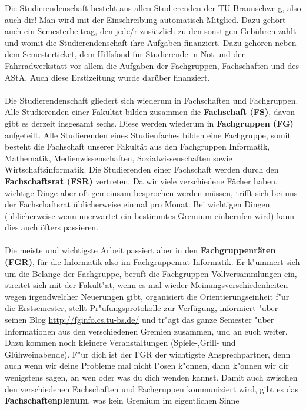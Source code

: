 Die Studierendenschaft besteht aus allen Studierenden der TU Braunschweig, also auch dir!
Man wird mit der Einschreibung automatisch Mitglied. Dazu gehört auch ein Semesterbeitrag, den jede/r 
zusätzlich zu den sonstigen Gebühren zahlt und womit die Studierendenschaft ihre Aufgaben finanziert. 
Dazu gehören neben dem Semesterticket, dem Hilfsfond für Studierende in Not und der 
Fahrradwerkstatt vor allem die Aufgaben der Fachgruppen, Fachschaften und des AStA. Auch diese
Erstizeitung wurde darüber finanziert.
\\
\\
Die Studierendenschaft gliedert sich wiederum in Fachschaften und Fachgruppen.
Alle Studierenden einer Fakultät bilden zusammen die \textbf{Fachschaft (FS)}, davon gibt es derzeit insgesamt sechs.
Diese werden wiederum in  \textbf{Fachgruppen (FG)} aufgeteilt. Alle Studierenden eines Studienfaches bilden eine Fachgruppe, 
somit besteht die Fachschaft unserer Fakultät aus den Fachgruppen Informatik, Mathematik, Medienwissenschaften, Sozialwissenschaften sowie 
Wirtschaftsinformatik. Die Studierenden einer Fachschaft werden  durch den 
\textbf{Fachschaftsrat (FSR)} vertreten. Da wir viele verschiedene Fächer haben, wichtige Dinge aber oft gemeinsam besprochen werden müssen,
trifft sich bei uns der Fachschaftsrat üblicherweise einmal pro Monat. 
Bei wichtigen Dingen (üblicherweise wenn unerwartet ein bestimmtes Gremium einberufen wird) kann dies auch öfters passieren.
\\
\\
Die meiste und wichtigste Arbeit passiert aber in den \textbf{Fachgruppenräten (FGR)}, 
für die Informatik also im Fachgruppenrat Informatik. Er k"ummert sich um die Belange der
Fachgruppe, beruft die Fachgruppen-Vollversammlungen ein, streitet sich mit der
Fakult"at, wenn es mal wieder Meinungsverschiedenheiten wegen irgendwelcher 
Neuerungen gibt, organisiert die Orientierungseinheit f"ur die Erstsemester, stellt Pr"ufungsprotokolle 
zur Verfügung, informiert 
"uber seinen Blog \url{http://fginfo.cs.tu-bs.de/}
 und tr"agt das ganze Semester "uber 
Informationen aus den verschiedenen Gremien zusammen, und an euch weiter.
Dazu kommen noch kleinere Veranstaltungen (Spiele-,Grill- und Glühweinabende).
F"ur dich ist der FGR der wichtigste Ansprechpartner, denn auch wenn wir deine Probleme mal nicht l"osen 
k"onnen, dann k"onnen wir dir wenigstens sagen, an wen oder was du dich wenden 
kannst. Damit auch zwischen den verschiedenen Fachschaften
und Fachgruppen kommuniziert wird, 
gibt es das \textbf{Fachschaftenplenum}, was kein Gremium im eigentlichen Sinne 
